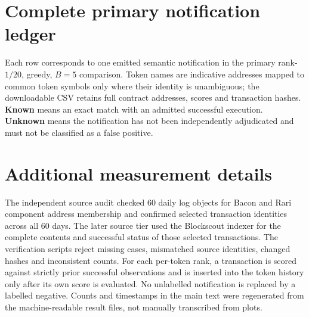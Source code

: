 \documentclass[preprint,12pt,authoryear]{elsarticle}
\begin{document}
\appendix
\section{Complete primary notification ledger}\label{app:alerts}
Each row corresponds to one emitted semantic notification in the primary rank-$1/20$, greedy, $B=5$ comparison. Token names are indicative addresses mapped to common token symbols only where their identity is unambiguous; the downloadable CSV retains full contract addresses, scores and transaction hashes. \textbf{Known} means an exact match with an admitted successful execution. \textbf{Unknown} means the notification has not been independently adjudicated and must not be classified as a false positive.



\section{Additional measurement details}\label{app:measurement}
The independent source audit checked 60 daily log objects for Bacon and Rari component address membership and confirmed selected transaction identities across all 60 days. The later source tier used the Blockscout indexer for the complete contents and successful status of those selected transactions. The verification scripts reject missing cases, mismatched source identities, changed hashes and inconsistent counts. For each per-token rank, a transaction is scored against strictly prior successful observations and is inserted into the token history only after its own score is evaluated. No unlabelled notification is replaced by a labelled negative. Counts and timestamps in the main text were regenerated from the machine-readable result files, not manually transcribed from plots.


\begingroup\sloppy\endgroup
\end{document}
